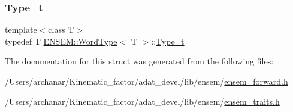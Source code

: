 \mbox{\label{structENSEM_1_1WordType_a81392e736486edab6c96af6198ab8337}} 
\subsubsection{\texorpdfstring{Type\_t}{Type\_t}\hspace{0.1cm}{\footnotesize\ttfamily [2/2]}}
{\footnotesize\ttfamily template$<$class T$>$ \\
typedef T \mbox{\hyperlink{structENSEM_1_1WordType}{E\+N\+S\+E\+M\+::\+Word\+Type}}$<$ T $>$\+::\mbox{\hyperlink{structENSEM_1_1WordType_a81392e736486edab6c96af6198ab8337}{Type\+\_\+t}}}



The documentation for this struct was generated from the following files\+:\begin{DoxyCompactItemize}
\item 
/\+Users/archanar/\+Kinematic\+\_\+factor/adat\+\_\+devel/lib/ensem/\mbox{\hyperlink{lib_2ensem_2ensem__forward_8h}{ensem\+\_\+forward.\+h}}\item 
/\+Users/archanar/\+Kinematic\+\_\+factor/adat\+\_\+devel/lib/ensem/\mbox{\hyperlink{lib_2ensem_2ensem__traits_8h}{ensem\+\_\+traits.\+h}}\end{DoxyCompactItemize}
